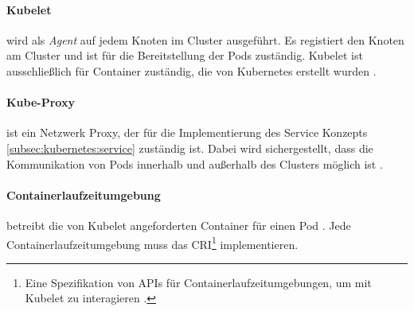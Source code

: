 \paragraph{Kubelet} wird als \emph{Agent} auf jedem Knoten im Cluster ausgeführt. 
Es registiert den Knoten am Cluster und ist für die Bereitstellung der Pods zuständig.
Kubelet ist ausschließlich für Container zuständig, die von Kubernetes erstellt wurden \cite{kubernetesComponents}.

\paragraph{Kube-Proxy} ist ein Netzwerk Proxy, der für die Implementierung des Service Konzepts \ref{subsec:kubernetes:service}
zuständig ist. 
Dabei wird sichergestellt, dass die Kommunikation von Pods innerhalb und außerhalb des Clusters möglich ist \cite{kubernetesComponents}.

\paragraph{Containerlaufzeitumgebung} betreibt die von Kubelet angeforderten Container für einen Pod \cite{kubernetesComponents}. 
Jede Containerlaufzeitumgebung muss das 
\ac{CRI}\footnote{Eine Spezifikation von APIs für Containerlaufzeitumgebungen, um mit Kubelet zu interagieren \cite{cri}.} implementieren.
